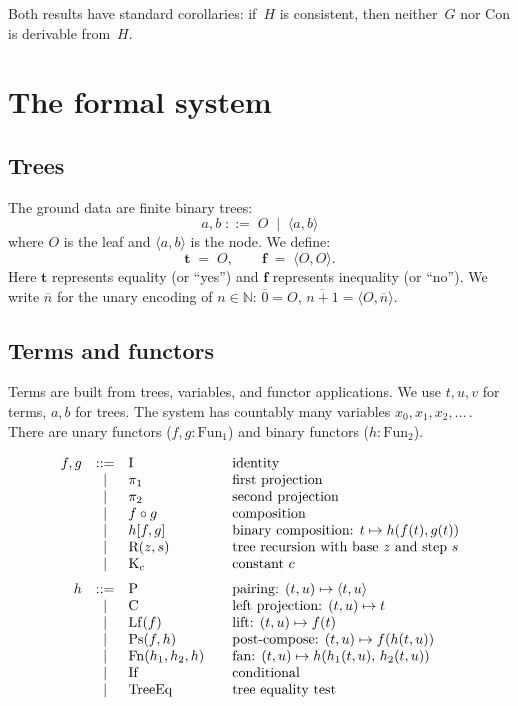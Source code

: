\documentclass[11pt]{article}
\newcommand{\pair}[2]{\langle #1, #2 \rangle}
\newcommand{\trueT}{\mathbf{t}}
\newcommand{\falseT}{\mathbf{f}}
\newcommand{\nat}[1]{\overline{#1}}
\newcommand{\TreeEq}{\mathrm{TreeEq}}
\begin{document}
\noindent
Both results have standard corollaries:
if~$H$ is consistent, then neither~$G$ nor $\mathrm{Con}$
is derivable from~$H$.

\section{The formal system}

\subsection*{Trees}

The ground data are finite binary trees:
\[
  a, b \;::=\; O \;\mid\; \pair{a}{b}
\]
where $O$ is the leaf and $\pair{a}{b}$ is the node.
We define:
\[
  \trueT \;=\; O, \qquad \falseT \;=\; \pair{O}{O}.
\]
Here $\trueT$ represents equality (or ``yes'') and $\falseT$
represents inequality (or ``no'').
We write $\nat{n}$ for the unary encoding of $n \in \mathbb{N}$:
$\nat{0} = O$, $\nat{n+1} = \pair{O}{\nat{n}}$.

\subsection*{Terms and functors}

Terms are built from trees, variables, and functor applications.
We use $t, u, v$ for terms, $a, b$ for trees.
The system has countably many variables $x_0, x_1, x_2, \ldots$\,.
There are unary functors ($f, g : \mathrm{Fun}_1$) and binary
functors ($h : \mathrm{Fun}_2$).

\[
\begin{array}{rcl@{\qquad}l}
  f, g &::=& \mathrm{I} & \text{identity} \\
       &\mid& \pi_1 & \text{first projection} \\
       &\mid& \pi_2 & \text{second projection} \\
       &\mid& f \circ g & \text{composition} \\
       &\mid& h[f, g] & \text{binary composition: } t \mapsto h(f(t), g(t)) \\
       &\mid& \mathrm{R}(z, s) & \text{tree recursion with base } z \text{ and step } s \\
       &\mid& \mathrm{K}_c & \text{constant } c \\[6pt]
  h &::=& \mathrm{P} & \text{pairing: } (t, u) \mapsto \pair{t}{u} \\
    &\mid& \mathrm{C} & \text{left projection: } (t, u) \mapsto t \\
    &\mid& \mathrm{Lf}(f) & \text{lift: } (t, u) \mapsto f(t) \\
    &\mid& \mathrm{Ps}(f, h) & \text{post-compose: } (t, u) \mapsto f(h(t, u)) \\
    &\mid& \mathrm{Fn}(h_1, h_2, h) & \text{fan: } (t, u) \mapsto h(h_1(t,u),\, h_2(t,u)) \\
    &\mid& \mathrm{If} & \text{conditional} \\
    &\mid& \TreeEq & \text{tree equality test}
\end{array}
\]
\end{document}
